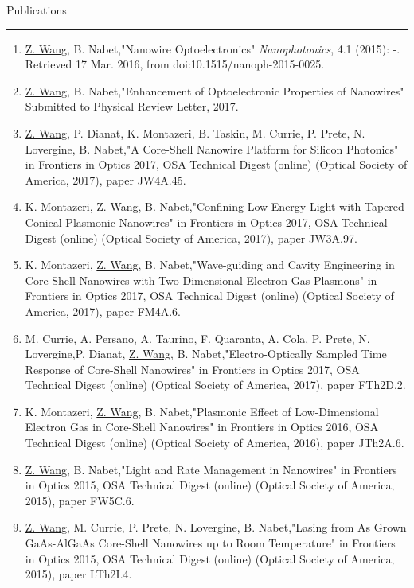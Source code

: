 \begin{vita}
{\Large\scshape\raggedright{Publications}}
\newline
\rule{\textwidth}{1pt}
\begin{enumerate}
\item \underline{Z. Wang}, B. Nabet,"Nanowire Optoelectronics" \emph{Nanophotonics}, 4.1 (2015): -. Retrieved 17 Mar. 2016, from doi:10.1515/nanoph-2015-0025.
\item \underline{Z. Wang}, B. Nabet,"Enhancement of Optoelectronic Properties of Nanowires" Submitted to Physical Review Letter, 2017.
\item \underline{Z. Wang}, P. Dianat, K. Montazeri, B. Taskin, M. Currie, P. Prete, N. Lovergine, B. Nabet,"A Core-Shell Nanowire Platform for Silicon Photonics" in Frontiers in Optics 2017, OSA Technical Digest (online) (Optical Society of America, 2017), paper JW4A.45.
\item K. Montazeri, \underline{Z. Wang}, B. Nabet,"Confining Low Energy Light with Tapered Conical Plasmonic Nanowires" in Frontiers in Optics 2017, OSA Technical Digest (online) (Optical Society of America, 2017), paper JW3A.97.
\item K. Montazeri, \underline{Z. Wang}, B. Nabet,"Wave-guiding and Cavity Engineering in Core-Shell Nanowires with Two Dimensional Electron Gas Plasmons" in Frontiers in Optics 2017, OSA Technical Digest (online) (Optical Society of America, 2017), paper FM4A.6.
\item M. Currie, A. Persano, A. Taurino, F. Quaranta, A. Cola, P. Prete, N. Lovergine,P. Dianat, \underline{Z. Wang}, B. Nabet,"Electro-Optically Sampled Time Response of Core-Shell Nanowires" in Frontiers in Optics 2017, OSA Technical Digest (online) (Optical Society of America, 2017), paper FTh2D.2.
\item K. Montazeri, \underline{Z. Wang}, B. Nabet,"Plasmonic Effect of Low-Dimensional Electron Gas in Core-Shell Nanowires" in Frontiers in Optics 2016, OSA Technical Digest (online) (Optical Society of America, 2016), paper JTh2A.6.
\item \underline{Z. Wang}, B. Nabet,"Light and Rate Management in Nanowires" in Frontiers in Optics 2015, OSA Technical Digest (online) (Optical Society of America, 2015), paper FW5C.6.
\item \underline{Z. Wang}, M. Currie,  P. Prete, N. Lovergine, B. Nabet,"Lasing from As Grown GaAs-AlGaAs Core-Shell Nanowires up to Room Temperature" in Frontiers in Optics 2015, OSA Technical Digest (online) (Optical Society of America, 2015), paper LTh2I.4.

\end{enumerate}
\end{vita}
